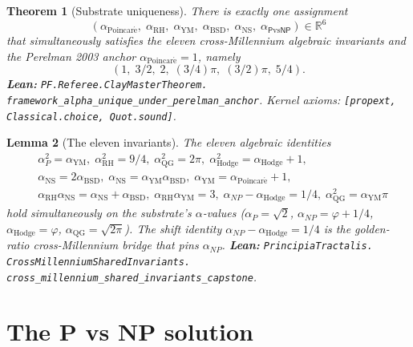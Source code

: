 \documentclass[11pt,a4paper]{article}
\theoremstyle{plain}
\newtheorem{theorem}{Theorem}[section]
\newtheorem{lemma}[theorem]{Lemma}
\theoremstyle{definition}
\begin{document}
\begin{theorem}[Substrate uniqueness]
\label{thm:substrate}
There is exactly one assignment
\[
(\alpha_{\mathrm{Poincar\acute e}},\;
\alpha_{\mathrm{RH}},\;
\alpha_{\mathrm{YM}},\;
\alpha_{\mathrm{BSD}},\;
\alpha_{\mathrm{NS}},\;
\alpha_{\mathsf{P}\mathrm{vs}\mathsf{NP}}) \in \mathbb{R}^{6}
\]
that simultaneously satisfies the eleven cross-Millennium algebraic
invariants and the Perelman 2003 anchor
$\alpha_{\mathrm{Poincar\acute e}} = 1$, namely
\[
(1,\;3/2,\;2,\;(3/4)\pi,\;(3/2)\pi,\;5/4).
\]
\textbf{Lean:}
\texttt{PF.Referee.ClayMasterTheorem.\\
framework\_alpha\_unique\_under\_perelman\_anchor}.
Kernel axioms: \texttt{[propext, Classical.choice, Quot.sound]}.
\end{theorem}

\begin{lemma}[The eleven invariants]
\label{lem:invariants}
The eleven algebraic identities
\[
\begin{aligned}
&\alpha_{P}^{2} = \alpha_{\mathrm{YM}}, \;
\alpha_{\mathrm{RH}}^{2} = 9/4, \;
\alpha_{\mathrm{QG}}^{2} = 2\pi, \;
\alpha_{\mathrm{Hodge}}^{2} = \alpha_{\mathrm{Hodge}} + 1, \\
&\alpha_{\mathrm{NS}} = 2 \alpha_{\mathrm{BSD}}, \;
\alpha_{\mathrm{NS}} = \alpha_{\mathrm{YM}} \alpha_{\mathrm{BSD}}, \;
\alpha_{\mathrm{YM}} = \alpha_{\mathrm{Poincar\acute e}} + 1, \\
&\alpha_{\mathrm{RH}} \alpha_{\mathrm{NS}} =
  \alpha_{\mathrm{NS}} + \alpha_{\mathrm{BSD}}, \;
\alpha_{\mathrm{RH}} \alpha_{\mathrm{YM}} = 3, \;
\alpha_{NP} - \alpha_{\mathrm{Hodge}} = 1/4, \;
\alpha_{\mathrm{QG}}^{2} = \alpha_{\mathrm{YM}} \pi
\end{aligned}
\]
hold simultaneously on the substrate's $\alpha$-values
($\alpha_{P} = \sqrt{2}$, $\alpha_{NP} = \varphi + 1/4$,
$\alpha_{\mathrm{Hodge}} = \varphi$,
$\alpha_{\mathrm{QG}} = \sqrt{2\pi}$).
The shift identity $\alpha_{NP} - \alpha_{\mathrm{Hodge}} = 1/4$ is the
golden-ratio cross-Millennium bridge that pins $\alpha_{NP}$.
\textbf{Lean:}
\texttt{PrincipiaTractalis.\\
CrossMillenniumSharedInvariants.\\
cross\_millennium\_shared\_invariants\_capstone}.
\end{lemma}

\section{The P vs NP solution}
\label{sec:pvsnp}
\end{document}
